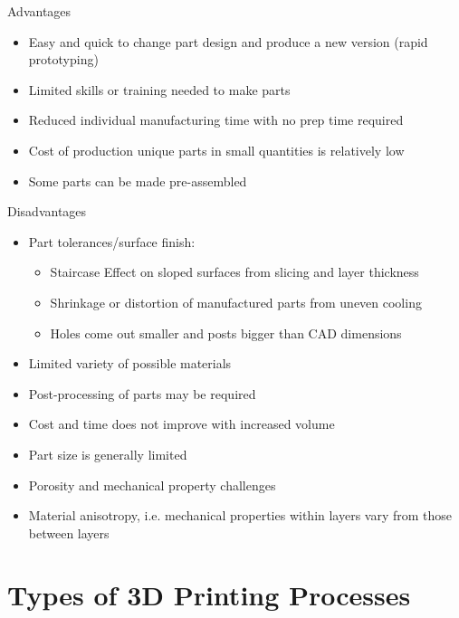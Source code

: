 \documentclass{article}
\begin{document}
Advantages
\begin{itemize}
    \item Easy and quick to change part design and produce a new version (rapid prototyping)
    \item Limited skills or training needed to make parts
    \item Reduced individual manufacturing time with no prep time required
    \item Cost of production unique parts in small quantities is relatively low
    \item Some parts can be made pre-assembled
\end{itemize}
Disadvantages
\begin{itemize}
    \item Part tolerances/surface finish:
        \begin{itemize}
            \item Staircase Effect on sloped surfaces from slicing and layer thickness
            \item Shrinkage or distortion of manufactured parts from uneven cooling
            \item Holes come out smaller and posts bigger than CAD dimensions
        \end{itemize}
    \item Limited variety of possible materials
    \item Post-processing of parts may be required
    \item Cost and time does not improve with increased volume
    \item Part size is generally limited
    \item Porosity and mechanical property challenges
    \item Material anisotropy, i.e. mechanical properties within layers vary from those between layers
\end{itemize}

\section{Types of 3D Printing Processes}
\end{document}
